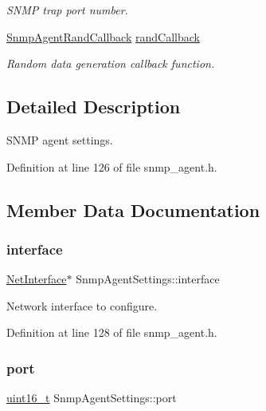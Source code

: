 \begin{DoxyCompactItemize}
\begin{DoxyCompactList}\small\item\em S\+N\+MP trap port number. \end{DoxyCompactList}\item 
\hyperlink{snmp__agent_8h_a334661b589244d199b0e28790b1ab823}{Snmp\+Agent\+Rand\+Callback} \hyperlink{structSnmpAgentSettings_a48ad68f4f7fd56d9f64acab57420398d}{rand\+Callback}
\begin{DoxyCompactList}\small\item\em Random data generation callback function. \end{DoxyCompactList}\end{DoxyCompactItemize}


\subsection{Detailed Description}
S\+N\+MP agent settings. 

Definition at line 126 of file snmp\+\_\+agent.\+h.



\subsection{Member Data Documentation}
\mbox{\label{structSnmpAgentSettings_ab6c457ae9ee27a3160d9e3d5cb847439}} 
\subsubsection{\texorpdfstring{interface}{interface}}
{\footnotesize\ttfamily \hyperlink{net_8h_a2234db8911a1148c9159979d8f5e0d6b}{Net\+Interface}$\ast$ Snmp\+Agent\+Settings\+::interface}



Network interface to configure. 



Definition at line 128 of file snmp\+\_\+agent.\+h.

\mbox{\label{structSnmpAgentSettings_a65d509855573423c26fbdf01cfc5a713}} 
\subsubsection{\texorpdfstring{port}{port}}
{\footnotesize\ttfamily \hyperlink{stdint_8h_a273cf69d639a59973b6019625df33e30}{uint16\+\_\+t} Snmp\+Agent\+Settings\+::port}



